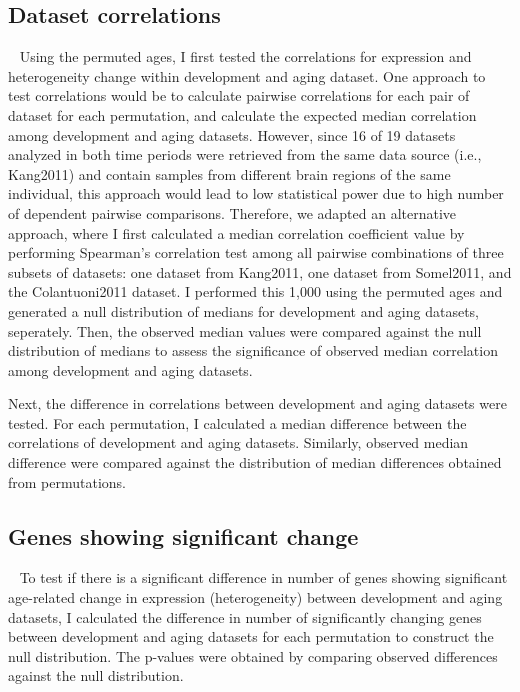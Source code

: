 \subsection{Dataset correlations}~\label{subsec:perm.corr}
Using the permuted ages, I first tested the correlations for expression and heterogeneity change within development and aging dataset.
One approach to test correlations would be to calculate pairwise correlations for each pair of dataset for each permutation,
and calculate the expected median correlation among development and aging datasets.
However, since 16 of 19 datasets analyzed in both time periods were retrieved from the same data source (i.e., Kang2011) and contain samples from different brain regions of the same individual,
this approach would lead to low statistical power due to high number of dependent pairwise comparisons.
Therefore, we adapted an alternative approach, where I first calculated a median correlation coefficient value
by performing Spearman's correlation test among all pairwise combinations of three subsets of datasets: one dataset from Kang2011, one dataset from Somel2011, and the Colantuoni2011 dataset.
I performed this 1,000 using the permuted ages and generated a null distribution of medians for development and aging datasets, seperately. 
Then, the observed median values were compared against the null distribution of medians to assess the significance of observed median correlation among development and aging datasets.

Next, the difference in correlations between development and aging datasets were tested. 
For each permutation, I calculated a median difference between the correlations of development and aging datasets.
Similarly, observed median difference were compared against the distribution of median differences obtained from permutations.

\subsection{Genes showing significant change}~\label{subsec:perm.sig.change}
To test if there is a significant difference in number of genes showing significant age-related change in expression (heterogeneity) between development and aging datasets,
I calculated the difference in number of significantly changing genes between development and aging datasets for each permutation to construct the null distribution.
The p-values were obtained by comparing observed differences against the null distribution.

